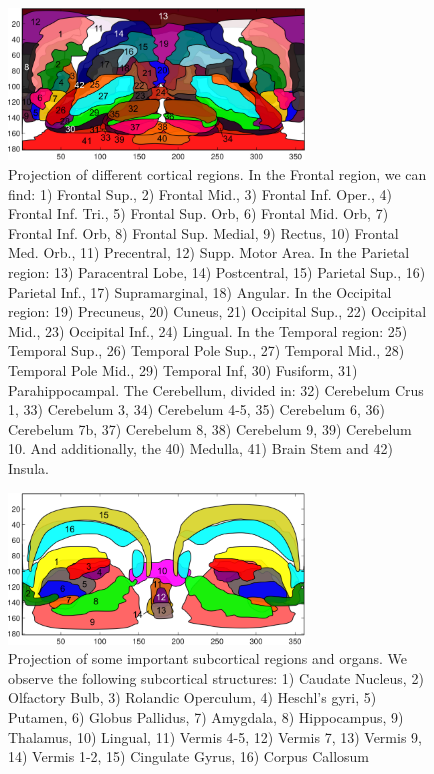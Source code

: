 \begin{figure}[htp]
	\centering
	\includegraphics[width=0.7\textwidth]{Graphics/ch6/05-regions_cortical}
	
	\caption{Projection of different cortical regions. In the Frontal region, we can find: 1) Frontal Sup., 2) Frontal Mid., 3) Frontal Inf. Oper., 4) Frontal Inf. Tri., 5) Frontal Sup. Orb, 6) Frontal Mid. Orb, 7) Frontal Inf. Orb, 8) Frontal Sup. Medial, 9) Rectus, 10) Frontal Med. Orb., 11) Precentral, 12) Supp. Motor Area. In the Parietal region: 13) Paracentral Lobe, 14) Postcentral, 15) Parietal Sup., 16) Parietal Inf., 17) Supramarginal, 18) Angular. In the Occipital region: 19) Precuneus, 20) Cuneus, 21) Occipital Sup., 22) Occipital Mid., 23) Occipital Inf., 24) Lingual. In the Temporal region: 25) Temporal Sup., 26) Temporal Pole Sup., 27) Temporal Mid., 28) Temporal Pole Mid., 29) Temporal Inf, 30) Fusiform, 31) Parahippocampal. The Cerebellum, divided in: 32) Cerebelum Crus 1, 33) Cerebelum 3, 34) Cerebelum 4-5, 35) Cerebelum 6, 36) Cerebelum 7b, 37) Cerebelum 8, 38) Cerebelum 9, 39) Cerebelum 10. And additionally, the 40) Medulla, 41) Brain Stem and 42) Insula.}
	\label{fig:regionsCort}
\end{figure}

\begin{figure}[htp]
	\centering
	\includegraphics[width=0.7\textwidth]{Graphics/ch6/06-regions_subcortical}
	
	\caption{Projection of some important subcortical regions and organs. We observe the following subcortical structures: 1) Caudate Nucleus, 2) Olfactory Bulb, 3) Rolandic Operculum, 4) Heschl's gyri, 5) Putamen, 6) Globus Pallidus, 7) Amygdala, 8) Hippocampus, 9) Thalamus, 10) Lingual, 11) Vermis 4-5, 12) Vermis 7, 13) Vermis 9, 14) Vermis 1-2, 15) Cingulate Gyrus, 16) Corpus Callosum}
	\label{fig:regionsSub}
\end{figure}

